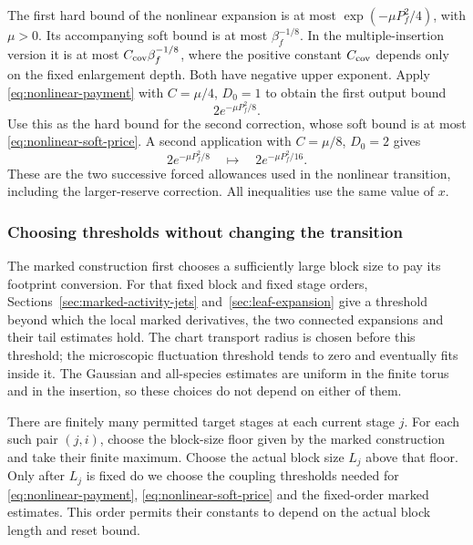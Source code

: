The first hard bound of the nonlinear expansion is at most
$\exp(-\mu P_f^2/4)$, with $\mu>0$. Its accompanying soft bound
is at most $\beta_f^{-1/8}$. In the multiple-insertion version it
is at most $C_{\rm cov}\beta_f^{-1/8}$, where the positive constant
$C_{\rm cov}$ depends only on the fixed enlargement depth. Both
have negative upper exponent. Apply
\eqref{eq:nonlinear-payment} with $C=\mu/4$, $D_0=1$ to obtain
the first output bound
\[
                     2e^{-\mu P_f^2/8}.
\]
Use this as the hard bound for the second correction, whose soft
bound is at most \eqref{eq:nonlinear-soft-price}. A second
application with $C=\mu/8$, $D_0=2$ gives
\begin{equation}\label{eq:nonlinear-two-payments}
          2e^{-\mu P_f^2/8}\quad\longmapsto\quad
                         2e^{-\mu P_f^2/16}.
\end{equation}
These are the two successive forced allowances used in the
nonlinear transition, including the larger-reserve correction.
All inequalities use the same value of $x$.

\subsubsection{Choosing thresholds without changing the transition}
The marked construction first chooses a sufficiently large block
size to pay its footprint conversion. For that fixed block and
fixed stage orders, Sections~\ref{sec:marked-activity-jets}
and~\ref{sec:leaf-expansion} give a threshold beyond which the
local marked derivatives, the two connected expansions and their
tail estimates hold. The chart transport radius is chosen before
this threshold; the microscopic fluctuation threshold tends to
zero and eventually fits inside it. The Gaussian and all-species
estimates are uniform in the finite torus and in the insertion,
so these choices do not depend on either of them.

There are finitely many permitted target stages at each current
stage $j$. For each such pair $(j,i)$, choose the block-size floor
given by the marked construction and take their finite maximum.
Choose the actual block size $L_j$ above that floor. Only after
$L_j$ is fixed do we choose the coupling thresholds needed for
\eqref{eq:nonlinear-payment}, \eqref{eq:nonlinear-soft-price}
and the fixed-order marked estimates. This order permits their
constants to depend on the actual block length and reset bound.

